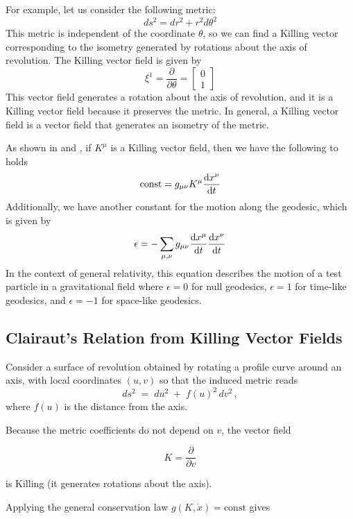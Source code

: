 \documentclass[12pt]{article}
\begin{document}
For example, let us consider the following metric:
\[
	ds^{2} = dr^{2} + r^{2}d\theta^{2} 
\]
This metric is independent of the coordinate \(\theta\), so we can find a Killing vector corresponding to the isometry generated by rotations about the axis of revolution.
The Killing vector field is given by
\[
	\xi^{1} = \frac{\partial}{\partial \theta} = \begin{bmatrix} 0 \\ 1 \end{bmatrix}
\]
This vector field generates a rotation about the axis of revolution, and it is a Killing vector field because it preserves the metric.
In general, a Killing vector field is a vector field that generates an isometry of the metric.


As shown in \cite{carrol2019spacetime} and \cite{atkins2018solving}, if $K^{\mu}$ is a Killing vector field, then we have the following to holds
\begin{equation}\label{eq:Killing_vector}
	\text{const} = g_{\mu\nu}K^{\mu}\dv{x^{\nu}}{t} 
\end{equation}
Additionally, we have another constant for the motion along the geodesic, which is given by
\begin{equation}\label{eq:epsilon_equation}
	\epsilon = - \sum_{\mu,\nu} g_{\mu\nu}\dv{x^{\mu}}{t}\dv{x^{\nu}}{t}
\end{equation}
In the context of general relativity, this equation describes the motion of a test particle in a gravitational field where \(\epsilon = 0\) for null geodesics, \(\epsilon = 1\) for time-like geodesics, and \(\epsilon = -1\) for space-like geodesics.

\subsection{Clairaut's Relation from Killing Vector Fields}

Consider a surface of revolution obtained by rotating a profile curve around an axis, with local coordinates $(u,v)$ so that the induced metric reads
$$
ds^2 \;=\; du^2 \;+\; f(u)^2\,dv^2\,,
$$
where $f(u)$ is the distance from the axis.

Because the metric coefficients do not depend on $v$, the vector field

$$
K = \frac{\partial}{\partial v}
$$

is Killing (it generates rotations about the axis).

Applying the general conservation law $g(K,\dot x)=\text{const}$ gives
\end{document}
